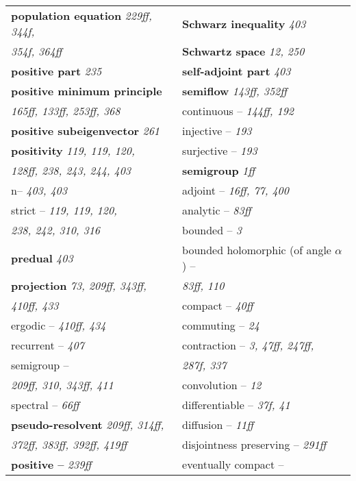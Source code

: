 \begin{longtable}{p{}p{}}
\textbf{population equation} \textit{229ff, 344f,} & \textbf{Schwarz inequality} \textit{403} \\
\quad \textit{354f, 364ff} & \textbf{Schwartz space} \textit{12, 250} \\
\textbf{positive part} \textit{235} & \textbf{self-adjoint part} \textit{403} \\
\textbf{positive minimum principle} & \textbf{semiflow} \textit{143ff, 352ff} \\
\quad \textit{165ff, 133ff, 253ff, 368} & \quad continuous -- \textit{144ff, 192} \\
\textbf{positive subeigenvector} \textit{261} & \quad injective -- \textit{193} \\
\textbf{positivity} \textit{119, 119, 120,} & \quad surjective -- \textit{193} \\
\quad \textit{128ff, 238, 243, 244, 403} & \textbf{semigroup} \textit{1ff} \\
\quad n-- \textit{403, 403} & \quad adjoint -- \textit{16ff, 77, 400} \\
\quad strict -- \textit{119, 119, 120,} & \quad analytic -- \textit{83ff} \\
\quad\quad \textit{238, 242, 310, 316} & \quad bounded -- \textit{3} \\
\textbf{predual} \textit{403} & \quad bounded holomorphic (of angle $ \alpha $) -- \\
\textbf{projection} \textit{73, 209ff, 343ff,} & \quad\quad \textit{83ff, 110} \\
\quad \textit{410ff, 433} & \quad compact -- \textit{40ff} \\
\quad ergodic -- \textit{410ff, 434} & \quad commuting -- \textit{24} \\
\quad recurrent -- \textit{407} & \quad contraction -- \textit{3, 47ff, 247ff,} \\
\quad semigroup -- & \quad\quad \textit{287f, 337} \\
\quad\quad \textit{209ff, 310, 343ff, 411} & \quad convolution -- \textit{12} \\
\quad spectral -- \textit{66ff} & \quad differentiable -- \textit{37f, 41} \\
\textbf{pseudo-resolvent} \textit{209ff, 314ff,} & \quad diffusion -- \textit{11ff} \\
\quad \textit{372ff, 383ff, 392ff, 419ff} & \quad disjointness preserving -- \textit{291ff} \\
\textbf{positive --} \textit{239ff} & \quad eventually compact -- \\

\end{longtable}
